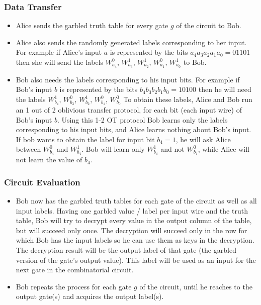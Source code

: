 \subsubsection{Data Transfer}
\begin{itemize}
  \item Alice sends the garbled truth table for every gate $g$ of the circuit to Bob.
  \item Alice also sends the randomly generated labels corresponding to her input.
  For example if Alice's input $a$ is represented by the bits $a_4a_3a_2a_1a_0 = 01101$ then she will send the labels $W_{a_4}^0$, $W_{a_3}^1$, $W_{a_2}^1$, $W_{a_1}^0$, $W_{a_0}^1$ to Bob.
  \item Bob also needs the labels corresponding to his input bits. For example if Bob's input $b$ is represented by the bits $b_4b_3b_2b_1b_0 = 10100$ then he will need the labels $W_{b_4}^1$, $W_{b_3}^0$, $W_{b_2}^1$, $W_{b_1}^0$, $W_{b_0}^0$
  To obtain these labels, Alice and Bob run an 1 out of 2 oblivious transfer protocol, for each bit (each input wire) of Bob's input $b$.
  Using this 1-2 OT protocol Bob learns only the labels corresponding to his input bits, and Alice learns nothing about Bob's input.
  If bob wants to obtain the label for input bit $b_4 = 1$, he will ask Alice between $W_{b_4}^0$ and $W_{b_4}^1$.
  Bob will learn only $W_{b_4}^1$ and not $W_{b_4}^0$, while Alice will not learn the value of $b_4$.
\end{itemize}

\subsubsection{Circuit Evaluation}
\begin{itemize}
  \item Bob now has the garbled truth tables for each gate of the circuit as well as all input labels. Having one garbled value / label per input wire and the truth table, Bob will try to decrypt every value in the output column of the table, but will succeed only once.
  The decryption will succeed only in the row for which Bob has the input labels so he can use them as keys in the decryption.
  The decryption result will be the output label of that gate (the garbled version of the gate's output value).
  This label will be used as an input for the next gate in the combinatorial circuit.
  \item Bob repeats the process for each gate $g$ of the circuit, until he reaches to the output gate(s) and acquires the output label(s).
\end{itemize}

